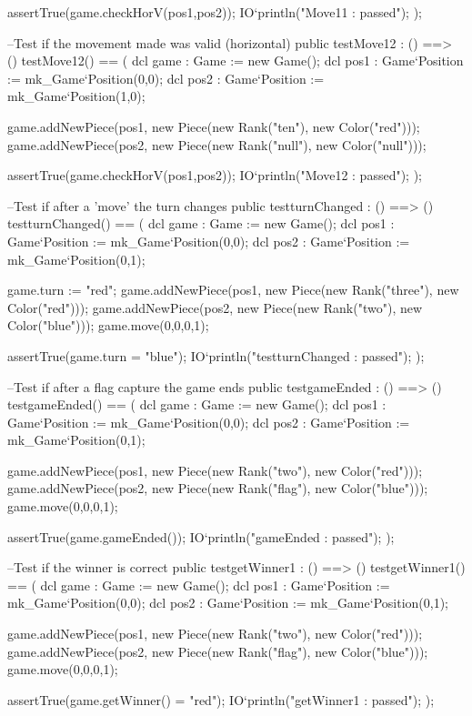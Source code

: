 \begin{vdm_al}
    assertTrue(game.checkHorV(pos1,pos2));
    IO`println("Move11 : passed");
   );
   
  --Test if the movement made was valid (horizontal)
  public testMove12 : () ==> ()
   testMove12() ==
   (
    dcl game : Game := new Game();
    dcl pos1 : Game`Position := mk_Game`Position(0,0);
    dcl pos2 : Game`Position := mk_Game`Position(1,0);
    
    game.addNewPiece(pos1, new Piece(new Rank("ten"), new Color("red")));
    game.addNewPiece(pos2, new Piece(new Rank("null"), new Color("null")));
    
    assertTrue(game.checkHorV(pos1,pos2));
    IO`println("Move12 : passed");
   );
  
  --Test if after a 'move' the turn changes
  public testturnChanged : () ==> ()
   testturnChanged() ==
   (
    dcl game : Game := new Game();
    dcl pos1 : Game`Position := mk_Game`Position(0,0);
    dcl pos2 : Game`Position := mk_Game`Position(0,1);
    
    game.turn := "red";
    game.addNewPiece(pos1, new Piece(new Rank("three"), new Color("red")));
    game.addNewPiece(pos2, new Piece(new Rank("two"), new Color("blue")));
    game.move(0,0,0,1);
    
    assertTrue(game.turn = "blue");
    IO`println("testturnChanged : passed");
   );
  
  --Test if after a flag capture the game ends
  public testgameEnded : () ==> ()
   testgameEnded() ==
   (
    dcl game : Game := new Game();
    dcl pos1 : Game`Position := mk_Game`Position(0,0);
    dcl pos2 : Game`Position := mk_Game`Position(0,1);
    
    game.addNewPiece(pos1, new Piece(new Rank("two"), new Color("red")));
    game.addNewPiece(pos2, new Piece(new Rank("flag"), new Color("blue")));
    game.move(0,0,0,1);
    
    assertTrue(game.gameEnded());
    IO`println("gameEnded : passed");
   );
  
  --Test if the winner is correct
  public testgetWinner1 : () ==> ()
   testgetWinner1() ==
   (
    dcl game : Game := new Game();
    dcl pos1 : Game`Position := mk_Game`Position(0,0);
    dcl pos2 : Game`Position := mk_Game`Position(0,1);
    
    game.addNewPiece(pos1, new Piece(new Rank("two"), new Color("red")));
    game.addNewPiece(pos2, new Piece(new Rank("flag"), new Color("blue")));
    game.move(0,0,0,1);
    
    assertTrue(game.getWinner() = "red");
    IO`println("getWinner1 : passed");
   );
   

\end{vdm_al}
